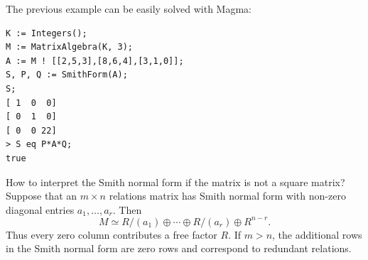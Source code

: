 The previous example can be easily 
solved with Magma:
\begin{lstlisting}
K := Integers();
M := MatrixAlgebra(K, 3);
A := M ! [[2,5,3],[8,6,4],[3,1,0]];
S, P, Q := SmithForm(A);
S;
[ 1  0  0]
[ 0  1  0]
[ 0  0 22]
> S eq P*A*Q;
true
\end{lstlisting}
How to interpret the Smith normal form if the matrix is not a square matrix? 
Suppose that an $m\times n$ relations matrix has Smith normal form
with non-zero diagonal entries $a_1,\dots,a_r$. Then
\[
M\simeq
R/(a_1)\oplus\cdots\oplus R/(a_r)\oplus R^{n-r}.
\]
Thus every zero column contributes a free factor $R$. If $m>n$,
the additional rows in the Smith normal form are zero rows and
correspond to redundant relations.

